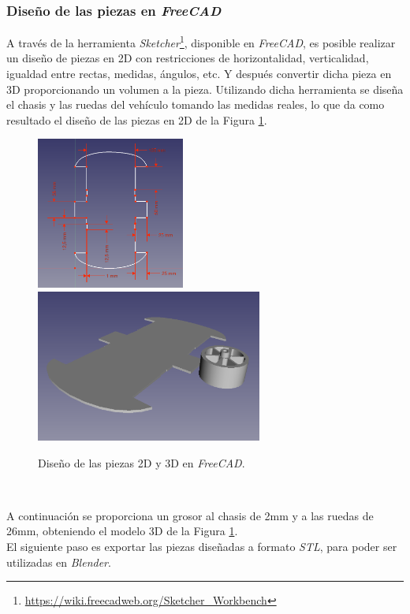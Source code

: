 \subsubsection{Diseño de las piezas en \textit{FreeCAD}}
A través de la herramienta \textit{Sketcher}\footnote{\url{https://wiki.freecadweb.org/Sketcher_Workbench}}, disponible en \textit{FreeCAD}, es posible realizar un diseño de piezas en 2D con restricciones de horizontalidad, verticalidad, igualdad entre rectas, medidas, ángulos, etc. Y después convertir dicha pieza en 3D proporcionando un volumen a la pieza. Utilizando dicha herramienta se diseña el chasis y las ruedas del vehículo tomando las medidas reales, lo que da como resultado el diseño de las piezas en 2D de la Figura \ref{fig:designfreecad}.\\
\begin{figure} [h!]
	\begin{center}
		\includegraphics[height=5cm]{figs/sketchFreecad}\hspace{0.1cm}\includegraphics[height=5cm]{figs/freecad}
	\end{center}
	\caption{Diseño de las piezas 2D y 3D en \textit{FreeCAD}.}
	\label{fig:designfreecad}
\end{figure}\

A continuación se proporciona un grosor al chasis de 2mm y a las ruedas de 26mm, obteniendo el modelo 3D de la Figura \ref{fig:designfreecad}.\\

El siguiente paso es exportar las piezas diseñadas a formato \textit{STL}, para poder ser utilizadas en \textit{Blender}.\\

